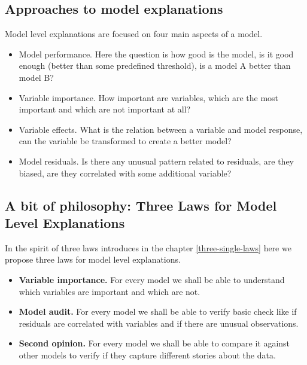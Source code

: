 \documentclass[12pt,]{krantz}
\providecommand{\tightlist}{%
  \setlength{\itemsep}{0pt}\setlength{\parskip}{0pt}}
\theoremstyle{definition}
\theoremstyle{definition}
\theoremstyle{definition}
\theoremstyle{remark}
\begin{document}
\hypertarget{approaches-to-model-explanations}{%
\subsection{Approaches to model
explanations}\label{approaches-to-model-explanations}}

Model level explanations are focused on four main aspects of a model.

\begin{itemize}
\tightlist
\item
  Model performance. Here the question is how good is the model, is it
  good enough (better than some predefined threshold), is a model A
  better than model B?
\item
  Variable importance. How important are variables, which are the most
  important and which are not important at all?
\item
  Variable effects. What is the relation between a variable and model
  response, can the variable be transformed to create a better model?
\item
  Model residuals. Is there any unusual pattern related to residuals,
  are they biased, are they correlated with some additional variable?
\end{itemize}

\hypertarget{a-bit-of-philosophy-three-laws-for-model-level-explanations}{%
\subsection{A bit of philosophy: Three Laws for Model Level
Explanations}\label{a-bit-of-philosophy-three-laws-for-model-level-explanations}}

In the spirit of three laws introduces in the chapter
\ref{three-single-laws} here we propose three laws for model level
explanations.

\begin{itemize}
\tightlist
\item
  \textbf{Variable importance.} For every model we shall be able to
  understand which variables are important and which are not.
\item
  \textbf{Model audit.} For every model we shall be able to verify basic
  check like if residuals are correlated with variables and if there are
  unusual observations.
\item
  \textbf{Second opinion.} For every model we shall be able to compare
  it against other models to verify if they capture different stories
  about the data.
\end{itemize}
\end{document}
